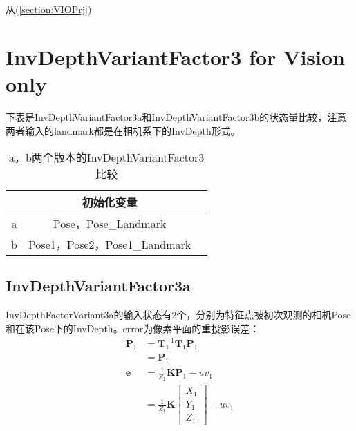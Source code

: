 \documentclass{article}
\begin{document}
从(\ref{section:VIOPrj})

\section{InvDepthVariantFactor3 for Vision only}
下表是InvDepthVariantFactor3a和InvDepthVariantFactor3b的状态量比较，注意两者输入的landmark都是在相机系下的InvDepth形式。
\begin{table}[H]
	\caption{a，b两个版本的InvDepthVariantFactor3比较}
	\centering
	\begin{tabular}{ccc}
		\toprule
		\textbf{} & \textbf{初始化变量}        \\
		\midrule
		a         & Pose，Pose\_Landmark           \\
		b         & Pose1，Pose2，Pose1\_Landmark \\
		\bottomrule
	\end{tabular}
\end{table}

\subsection{InvDepthVariantFactor3a}
InvDepthFactorVariant3a的输入状态有2个，分别为特征点被初次观测的相机Pose和在该Pose下的InvDepth。error为像素平面的重投影误差：
\begin{equation}
	\begin{aligned}
		\boldsymbol{P}_1 & = \boldsymbol{T}_1^{-1}\boldsymbol{T}_1\boldsymbol{P}_1 \\&=
		\boldsymbol{P}_1 \\
		\boldsymbol{e}   & = \frac{1}{Z_1}\boldsymbol{K} \boldsymbol{P}_1-uv_1     \\&=
		\frac{1}{Z_1}\boldsymbol{K}                            
		\left[
		\begin{matrix}
		X_1 \\
		Y_1 \\
		Z_1
		\end{matrix}
		\right]-uv_1
	\end{aligned}
\end{equation}
\end{document}
